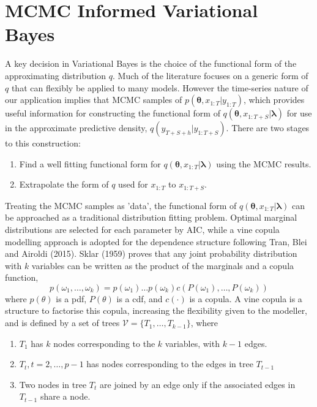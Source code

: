 \documentclass[12pt,a4paper]{article}%
\numberwithin{equation}{section}
\begin{document}
\section{MCMC Informed Variational Bayes}

A key decision in Variational Bayes is the choice of the functional form of the approximating distribution $q$. Much of the literature focuses on a generic form of $q$ that can flexibly be applied to many models. However the time-series nature of our application implies that MCMC samples of $p(\boldsymbol{\theta}, x_{1:T} | y_{1:T})$, which provides useful information for constructing the functional form of $q(\boldsymbol{\theta}, x_{1:T+S} | \boldsymbol{\lambda})$ for use in the approximate predictive density, $q(y_{T+S+h} | y_{1:T+S})$. There are two stages to this construction:
\begin{enumerate}
\item Find a well fitting functional form for $q(\boldsymbol{\theta}, x_{1:T} | \boldsymbol{\lambda})$ using the MCMC results.
\item Extrapolate the form of $q$ used for $x_{1:T}$ to $x_{1:T+S}$.
\end{enumerate}
Treating the MCMC samples as 'data', the functional form of $q(\boldsymbol{\theta}, x_{1:T} | \boldsymbol{\lambda})$ can be approached as a traditional distribution fitting problem. Optimal marginal distributions are selected for each parameter by AIC, while a vine copula modelling approach is adopted for the dependence structure following Tran, Blei and Airoldi (2015). Sklar (1959) proves that any joint probability distribution with $k$ variables can be written as the product of the marginals and a copula function,
\begin{equation}
\label{vc1}
p(\omega_1, \dots, \omega_k) = p(\omega_1) \dots p(\omega_k) c(P(\omega_1), \dots, P(\omega_k))
\end{equation}
where $p(\theta)$ is a pdf, $P(\theta)$ is a cdf, and $c(\cdot)$ is a copula. A vine copula is a structure to factorise this copula, increasing the flexibility given to the modeller, and is defined by a set of trees $\mathcal{V} = \{T_1, \dots, T_{k-1} \}$, where
\begin{enumerate}
\item $T_1$ has $k$ nodes corresponding to the $k$ variables, with $k-1$ edges.
\item $T_t, t = 2, \dots, p-1$ has nodes corresponding to the edges in tree $T_{t-1}$
\item Two nodes in tree $T_t$ are joined by an edge only if the associated edges in $T_{t-1}$ share a node. 
\end{enumerate}
\end{document}

